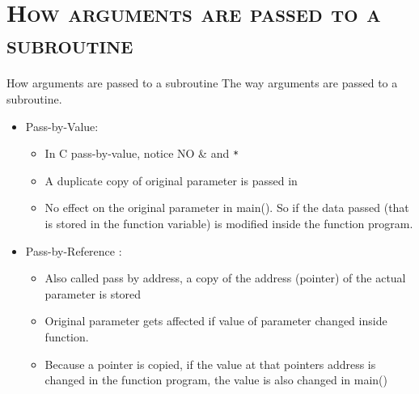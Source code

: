 \documentclass[xcolor=x11names,compress]{beamer}
\newcommand\Fontvi{\fontsize{6}{7.2}\selectfont}
\renewcommand{\(}{\begin{columns}}
\renewcommand{\)}{\end{columns}}
\newcommand{\<}[1]{\begin{column}{#1}}
\renewcommand{\>}{\end{column}}
\begin{document}
\section{\scshape How arguments are passed to a subroutine}
\begin{frame}[fragile]{How arguments are passed to a subroutine}
The way arguments are passed to a subroutine.  
\begin{itemize}
\item Pass-by-Value: %
\begin{itemize}
  \item In C pass-by-value, notice NO \& and \verb+*+  
  \item A duplicate copy of original parameter is passed in	
  \item No effect on the original parameter in main(). So if the data passed (that is stored in the function variable) is modified inside the function program.%
\end{itemize}
\item Pass-by-Reference : %
\begin{itemize}
  \item Also called pass by address, a copy of the address (pointer) of the actual parameter is stored
  \item Original parameter gets affected if value of parameter changed inside function.
  \item Because a pointer is copied, if the value at that pointers address is changed in the function program, the value is also changed in main()
\end{itemize}
\end{itemize}
\end{frame}
\end{document}
